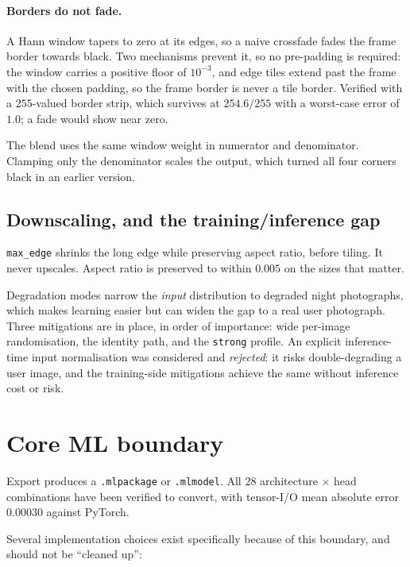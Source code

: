 \documentclass[11pt,a4paper]{article}
\newcommand{\code}[1]{\texttt{#1}}
\begin{document}
\paragraph{Borders do not fade.} A Hann window tapers to zero at its edges, so a
naive crossfade fades the frame border towards black. Two mechanisms prevent it,
so no pre-padding is required: the window carries a positive floor of $10^{-3}$,
and edge tiles extend past the frame with the chosen padding, so the frame border
is never a tile border. Verified with a $255$-valued border strip, which survives
at $254.6/255$ with a worst-case error of $1.0$; a fade would show near zero.

The blend uses the same window weight in numerator and denominator. Clamping only
the denominator scales the output, which turned all four corners black in an
earlier version.

\subsection{Downscaling, and the training/inference gap}

\code{max\_edge} shrinks the long edge while preserving aspect ratio, before
tiling. It never upscales. Aspect ratio is preserved to within $0.005$ on the
sizes that matter.

\noindent
Degradation modes narrow the \emph{input} distribution to degraded night
photographs, which makes learning easier but can widen the gap to a real user
photograph. Three mitigations are in place, in order of importance: wide
per-image randomisation, the identity path, and the \code{strong} profile. An
explicit inference-time input normalisation was considered and \emph{rejected}: it
risks double-degrading a user image, and the training-side mitigations achieve
the same without inference cost or risk.

\section{Core ML boundary}

Export produces a \code{.mlpackage} or \code{.mlmodel}. All $28$ architecture
$\times$ head combinations have been verified to convert, with tensor-I/O mean
absolute error $0.00030$ against PyTorch.

Several implementation choices exist specifically because of this boundary, and
should not be ``cleaned up'':
\end{document}
